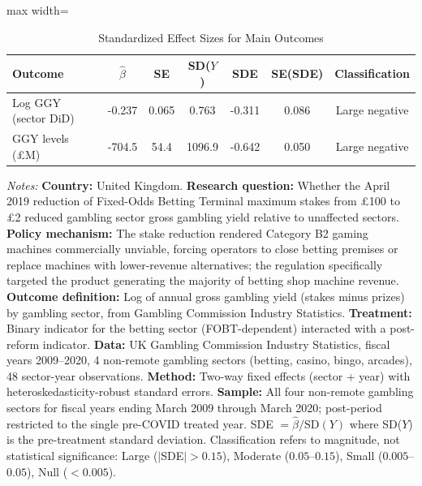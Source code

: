 \begin{table}[H]
\centering
\caption{Standardized Effect Sizes for Main Outcomes}
\begin{threeparttable}
\begin{adjustbox}{max width=\textwidth}
\begin{tabular}{lcccccc}
\toprule
Outcome & $\hat{\beta}$ & SE & SD($Y$) & SDE & SE(SDE) & Classification \\
\midrule
Log GGY (sector DiD) & -0.237 & 0.065 & 0.763 & -0.311 & 0.086 & Large negative \\
GGY levels (\pounds M) & -704.5 & 54.4 & 1096.9 & -0.642 & 0.050 & Large negative \\
\bottomrule
\end{tabular}
\end{adjustbox}
\begin{tablenotes}[flushleft]
\small
\item \textit{Notes:} \textbf{Country:} United Kingdom. \textbf{Research question:} Whether the April 2019 reduction of Fixed-Odds Betting Terminal maximum stakes from \pounds 100 to \pounds 2 reduced gambling sector gross gambling yield relative to unaffected sectors. \textbf{Policy mechanism:} The stake reduction rendered Category B2 gaming machines commercially unviable, forcing operators to close betting premises or replace machines with lower-revenue alternatives; the regulation specifically targeted the product generating the majority of betting shop machine revenue. \textbf{Outcome definition:} Log of annual gross gambling yield (stakes minus prizes) by gambling sector, from Gambling Commission Industry Statistics. \textbf{Treatment:} Binary indicator for the betting sector (FOBT-dependent) interacted with a post-reform indicator. \textbf{Data:} UK Gambling Commission Industry Statistics, fiscal years 2009--2020, 4 non-remote gambling sectors (betting, casino, bingo, arcades), 48 sector-year observations. \textbf{Method:} Two-way fixed effects (sector + year) with heteroskedasticity-robust standard errors. \textbf{Sample:} All four non-remote gambling sectors for fiscal years ending March 2009 through March 2020; post-period restricted to the single pre-COVID treated year. SDE $= \hat{\beta} / \text{SD}(Y)$ where SD($Y$) is the pre-treatment standard deviation. Classification refers to magnitude, not statistical significance: Large ($|$SDE$| > 0.15$), Moderate ($0.05$--$0.15$), Small ($0.005$--$0.05$), Null ($< 0.005$).
\end{tablenotes}
\end{threeparttable}
\label{tab:sde}
\end{table}

